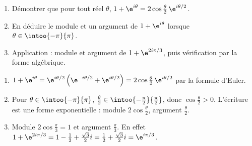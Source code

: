 \begin{exercise}
\begin{enumerate}
\item Démontrer que pour tout réel $\theta$, $1+\e^{i\theta}=2\cos\frac\theta2\,\e^{i\theta/2}$.
\item En déduire le module et un argument de $1+\e^{i\theta}$ lorsque $\theta\in\intoo{-\pi}{\pi}$.
\item Application : module et argument de $1+\e^{2i\pi/3}$, puis vérification par la forme algébrique.
\end{enumerate}
\end{exercise}
\begin{solution}
\begin{enumerate}
\item $1+\e^{i\theta}=\e^{i\theta/2}\left(\e^{-i\theta/2}+\e^{i\theta/2}\right)=2\cos\frac\theta2\,\e^{i\theta/2}$ par la formule d'Euler.
\item Pour $\theta\in\intoo{-\pi}{\pi}$, $\frac\theta2\in\intoo{-\frac\pi2}{\frac\pi2}$, donc $\cos\frac\theta2>0$. L'écriture est une forme exponentielle : module $2\cos\frac\theta2$, argument $\frac\theta2$.
\item Module $2\cos\frac\pi3=1$ et argument $\frac\pi3$. En effet $1+\e^{2i\pi/3}=1-\frac12+\frac{\sqrt3}2i=\frac12+\frac{\sqrt3}2i=\e^{i\pi/3}$.
\end{enumerate}
\end{solution}

